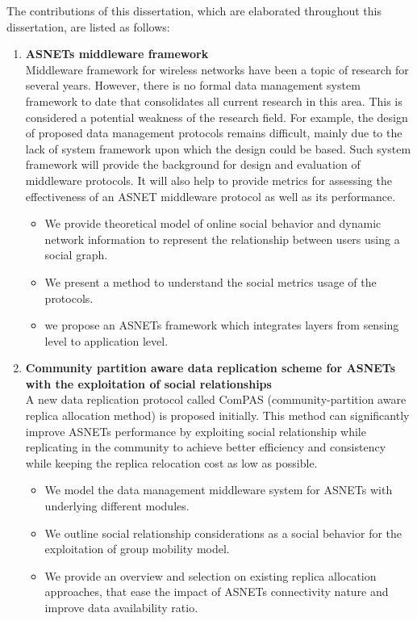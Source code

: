 The contributions of this dissertation, which are elaborated throughout this dissertation, are listed as follows:
\begin{enumerate}
    \item \textbf{ASNETs middleware framework}
    \\
    Middleware framework for wireless networks have been a topic of research for several years. However, there is no formal data management system framework to date that consolidates all current research in this area. This is considered a potential weakness of the research field. For example, the design of proposed data management protocols remains difficult, mainly due to the lack of system framework upon which the design could be based. Such system framework will provide the background for design and evaluation of middleware protocols. It will also help to provide metrics for assessing the effectiveness of an ASNET middleware protocol as well as its performance.
        \begin{itemize}
            \item We provide theoretical model of online social behavior and dynamic network information to represent the relationship between users using a social graph.
            \item We present a method to understand the social metrics usage of the protocols.
            \item we propose an ASNETs framework which integrates layers from sensing level to application level.
        \end{itemize}
    \item \textbf{Community partition aware data replication scheme for ASNETs with the exploitation of social relationships}
    \\
    A new data replication protocol called ComPAS (community-partition aware replica allocation method) is proposed initially. This method can significantly improve ASNETs performance by exploiting social relationship while replicating in the community to achieve better efficiency and consistency while keeping the replica relocation cost as low as possible.
        \begin{itemize}
            \item We model the data management middleware system for ASNETs with underlying different modules.
            \item We outline social relationship considerations as a social behavior for the exploitation of group mobility model.
            \item We provide an overview and selection on existing replica allocation approaches, that ease the impact of ASNETs connectivity nature and improve data availability ratio.

\end{itemize}
\end{enumerate}
